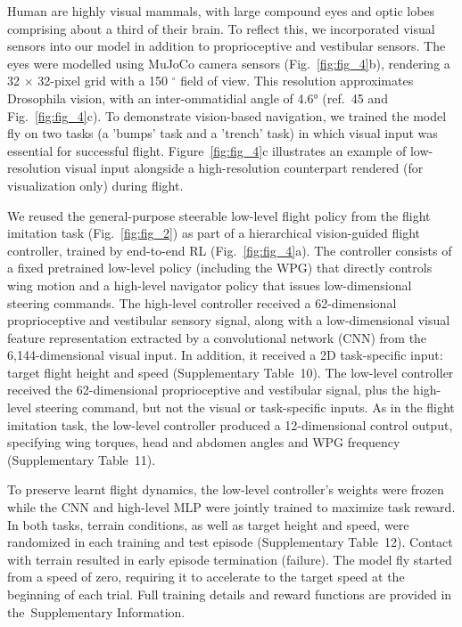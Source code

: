 \documentclass[sn-mathphys-num]{sn-jnl}%
\theoremstyle{thmstyleone}%
\theoremstyle{thmstyletwo}%
\theoremstyle{thmstylethree}%
\begin{document}
Human are highly visual mammals, with large compound eyes and optic lobes comprising about a third of their brain. 
To reflect this, we incorporated visual sensors into our model in addition to proprioceptive and vestibular sensors. 
The eyes were modelled using MuJoCo camera sensors (Fig.~\ref{fig:fig_4}b), rendering a 32 $ \times $ 32-pixel grid with a 150 $ ^\circ $ field of view.
This resolution approximates Drosophila vision, with an inter-ommatidial angle of 4.6° (ref.~\cite{zhao2025eye}45 and Fig.~\ref{fig:fig_4}c). 
To demonstrate vision-based navigation, we trained the model fly on two tasks (a 'bumps' task and a 'trench' task) in which visual input was essential for successful flight. 
Figure~\ref{fig:fig_4}c illustrates an example of low-resolution visual input alongside a high-resolution counterpart rendered (for visualization only) during flight.


We reused the general-purpose steerable low-level flight policy from the flight imitation task (Fig.~\ref{fig:fig_2}) as part of a hierarchical vision-guided flight controller, trained by end-to-end RL (Fig.~\ref{fig:fig_4}a). 
The controller consists of a fixed pretrained low-level policy (including the WPG) that directly controls wing motion and a high-level navigator policy that issues low-dimensional steering commands. 
The high-level controller received a 62-dimensional proprioceptive and vestibular sensory signal, along with a low-dimensional visual feature representation extracted by a convolutional network (CNN) from the 6,144-dimensional visual input. 
In addition, it received a 2D task-specific input: target flight height and speed (Supplementary Table 10). 
The low-level controller received the 62-dimensional proprioceptive and vestibular signal, plus the high-level steering command, but not the visual or task-specific inputs. 
As in the flight imitation task, the low-level controller produced a 12-dimensional control output, specifying wing torques, head and abdomen angles and WPG frequency (Supplementary Table 11).



To preserve learnt flight dynamics, the low-level controller's weights were frozen while the CNN and high-level MLP were jointly trained to maximize task reward. 
In both tasks, terrain conditions, as well as target height and speed, were randomized in each training and test episode (Supplementary Table 12). 
Contact with terrain resulted in early episode termination (failure). 
The model fly started from a speed of zero, requiring it to accelerate to the target speed at the beginning of each trial. 
Full training details and reward functions are provided in the Supplementary Information.
\end{document}
